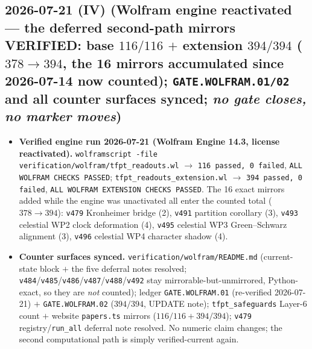 \subsection*{2026-07-21 (IV) (Wolfram engine reactivated --- the deferred second-path mirrors VERIFIED: base $116/116$ $+$ extension $394/394$ ($378\to394$, the 16 mirrors accumulated since 2026-07-14 now counted); \texttt{GATE.WOLFRAM.01/02} and all counter surfaces synced; \emph{no gate closes, no marker moves})}
\begin{itemize}[leftmargin=1.5em]
\item \textbf{Verified engine run 2026-07-21 (Wolfram Engine 14.3, license reactivated).}
\texttt{wolframscript -file verification/wolfram/tfpt\_readouts.wl} $\to$ \texttt{116 passed, 0 failed},
\texttt{ALL WOLFRAM CHECKS PASSED}; \texttt{tfpt\_readouts\_extension.wl} $\to$ \texttt{394 passed, 0
failed}, \texttt{ALL WOLFRAM EXTENSION CHECKS PASSED}. The 16 exact mirrors added while the engine was
unactivated all enter the counted total ($378\to394$): \texttt{v479} Kronheimer bridge (2), \texttt{v491}
partition corollary (3), \texttt{v493} celestial WP2 clock deformation (4), \texttt{v495} celestial WP3
Green--Schwarz alignment (3), \texttt{v496} celestial WP4 character shadow (4).
\item \textbf{Counter surfaces synced.} \texttt{verification/wolfram/README.md} (current-state block
$+$ the five deferral notes resolved; \texttt{v484}/\texttt{v485}/\texttt{v486}/\texttt{v487}/\texttt{v488}/\texttt{v492}
stay mirrorable-but-unmirrored, Python-exact, so they are \emph{not} counted); ledger
\texttt{GATE.WOLFRAM.01} (re-verified 2026-07-21) $+$ \texttt{GATE.WOLFRAM.02} ($394/394$, UPDATE note);
\texttt{tfpt\_safeguards} Layer-6 count $+$ website \texttt{papers.ts} mirrors ($116/116 + 394/394$);
\texttt{v479} registry/\texttt{run\_all} deferral note resolved. No numeric claim changes; the second
computational path is simply verified-current again.
\end{itemize}

